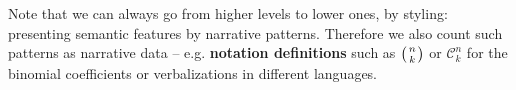 Note that we can always go from higher levels to lower ones, by styling: presenting semantic features by narrative patterns. Therefore we also count such patterns as narrative data -- e.g. \textbf{notation definitions} such as $\left(n\atop k\right)$ or $\mathcal{C}^n_k$ for the binomial coefficients or verbalizations in different languages.


